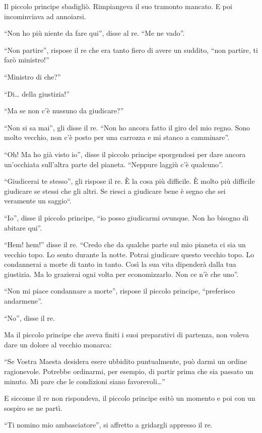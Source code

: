 \documentclass[11pt]{scrbook}
\begin{document}
Il piccolo principe sbadigliò. Rimpiangeva il suo tramonto mancato. E poi incominviava ad annoiarsi.

``Non ho più niente da fare qui'', disse al re. ``Me ne vado''.

``Non partire'', rispose il re che era tanto fiero di avere un suddito, ``non partire, ti farò ministro!''

``Ministro di che?''

``Di\ldots{} della giustizia!''

``Ma se non c'è nussuno da giudicare?''

``Non si sa mai'', gli disse il re. ``Non ho ancora fatto il giro del mio regno. Sono molto vecchio, non c'è posto per una carrozza e mi stanco a camminare''.

``Oh! Ma ho già visto io'', disse il piccolo principe sporgendosi per dare ancora un'occhiata sull'altra parte del pianeta. ``Neppure laggiù c'è qualcuno''.

``Giudicerai te stesso'', gli rispose il re. È la cosa più difficile. È molto più difficile giudicare se stessi che gli altri. Se riesci a giudicare bene è segno che sei veramente un saggio``.

``Io'', disse il piccolo principe, ``io posso giudicarmi ovunque. Non ho bisogno di abitare qui''.

``Hem! hem!'' disse il re. ``Credo che da qualche parte sul mio pianeta ci sia un vecchio topo. Lo sento durante la notte. Potrai giudicare questo vecchio topo. Lo condannerai a morte di tanto in tanto. Così la sua vita dipenderà dalla tua giustizia. Ma lo grazierai ogni volta per economizzarlo. Non ce n'è che uno''.

``Non mi piace condannare a morte'', rispose il piccolo principe, ``preferisco andarmene''.

``No'', disse il re.

Ma il piccolo principe che aveva finiti i suoi preparativi di partenza, non voleva dare un dolore al vecchio monarca:

``Se Vostra Maesta desidera esere ubbidito puntualmente, può darmi un ordine ragionevole. Potrebbe ordinarmi, per esempio, di partir prima che sia passato un minuto. Mi pare che le condizioni siano favorevoli\ldots{}''

E siccome il re non rispondeva, il piccolo principe esitò un momento e poi con un sospiro se ne partì.

``Ti nomino mio ambasciatore'', si affretto a gridargli appresso il re.
\end{document}

